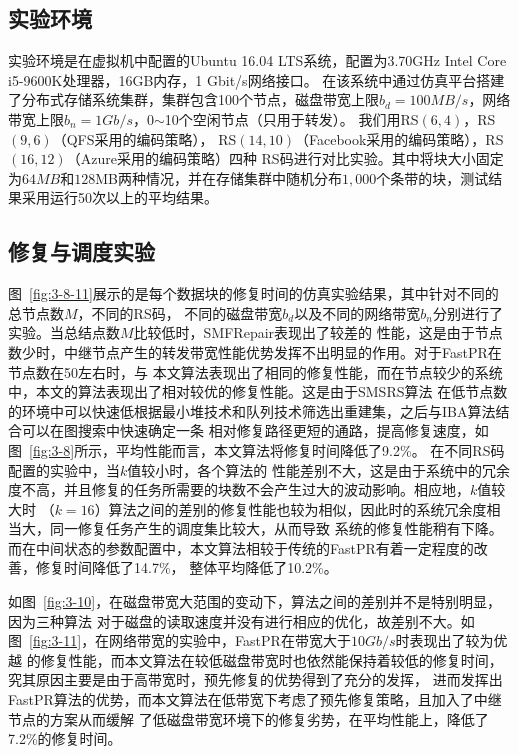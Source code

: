 \subsection{实验环境}
实验环境是在虚拟机中配置的Ubuntu 16.04 LTS系统，配置为3.70GHz Intel Core i5-9600K处理器，16GB内存，1 Gbit/s网络接口。
在该系统中通过仿真平台搭建了分布式存储系统集群，集群包含100个节点，磁盘带宽上限$b_d=100MB/s$，网络带宽上限$b_n=1Gb/s$，0$\sim$10个空闲节点（只用于转发）。
我们用RS$(6,4)$，RS$(9,6)$\cite{ovsiannikov2013quantcast}（QFS采用的编码策略），
RS$(14,10)$\cite{muralidhar2014f4}（Facebook采用的编码策略），RS$(16,12)$\cite{huang2012erasure}（Azure采用的编码策略）四种
RS码进行对比实验。其中将块大小固定为$64MB$和$128$MB两种情况，并在存储集群中随机分布$1,000$个条带的块，测试结果采用运行50次以上的平均结果。




\subsection{修复与调度实验}

图~\ref{fig:3-8-11}展示的是每个数据块的修复时间的仿真实验结果，其中针对不同的总节点数$M$，不同的RS码，
不同的磁盘带宽$b_d$以及不同的网络带宽$b_n$分别进行了实验。当总结点数$M$比较低时，SMFRepair表现出了较差的
性能，这是由于节点数少时，中继节点产生的转发带宽性能优势发挥不出明显的作用。对于FastPR在节点数在50左右时，与
本文算法表现出了相同的修复性能，而在节点较少的系统中，本文的算法表现出了相对较优的修复性能。这是由于SMSRS算法
在低节点数的环境中可以快速低根据最小堆技术和队列技术筛选出重建集，之后与IBA算法结合可以在图搜索中快速确定一条
相对修复路径更短的通路，提高修复速度，如图~\ref{fig:3-8}所示，平均性能而言，本文算法将修复时间降低了9.2\%。
在不同RS码配置的实验中，当$k$值较小时，各个算法的
性能差别不大，这是由于系统中的冗余度不高，并且修复的任务所需要的块数不会产生过大的波动影响。相应地，$k$值较大时
（$k=16$）算法之间的差别的修复性能也较为相似，因此时的系统冗余度相当大，同一修复任务产生的调度集比较大，从而导致
系统的修复性能稍有下降。而在中间状态的参数配置中，本文算法相较于传统的FastPR有着一定程度的改善，修复时间降低了14.7\%，
整体平均降低了10.2\%。

如图~\ref{fig:3-10}，在磁盘带宽大范围的变动下，算法之间的差别并不是特别明显，因为三种算法
对于磁盘的读取速度并没有进行相应的优化，故差别不大。如图~\ref{fig:3-11}，在网络带宽的实验中，FastPR在带宽大于$10Gb/s$时表现出了较为优越
的修复性能，而本文算法在较低磁盘带宽时也依然能保持着较低的修复时间，究其原因主要是由于高带宽时，预先修复的优势得到了充分的发挥，
进而发挥出FastPR算法的优势，而本文算法在低带宽下考虑了预先修复策略，且加入了中继节点的方案从而缓解
了低磁盘带宽环境下的修复劣势，在平均性能上，降低了7.2\%的修复时间。




